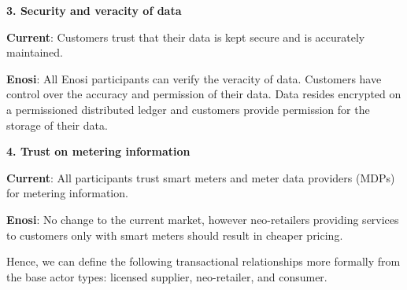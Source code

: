 \documentclass[a4paper,12pt,reqno]{amsart}
\theoremstyle{definition}
\begin{document}
\begin{mdframed}
\centering
\textbf{3. Security and veracity of data}
\end{mdframed}
\begin{mdframed}

\noindent \textbf{Current}: Customers trust that their data is kept secure and is accurately maintained. 

\noindent \textbf{Enosi}: All Enosi participants can verify the veracity of data. Customers have control over the accuracy and permission of their data. Data resides encrypted on a permissioned distributed ledger and customers provide permission for the storage of their data.

\end{mdframed}
\vspace{+1.5em}

\begin{mdframed}
\centering
\textbf{4. Trust on metering information}
\end{mdframed}

\begin{mdframed}

\noindent \textbf{Current}: All participants trust smart meters and meter data providers (MDPs) for metering information. 

\noindent \textbf{Enosi}: No change to the current market, however neo-retailers providing services to customers only with smart meters should result in cheaper pricing.

\end{mdframed}




\newpage

Hence, we can define the following transactional relationships more formally from the base actor types: licensed supplier, neo-retailer, and consumer.
\end{document}
